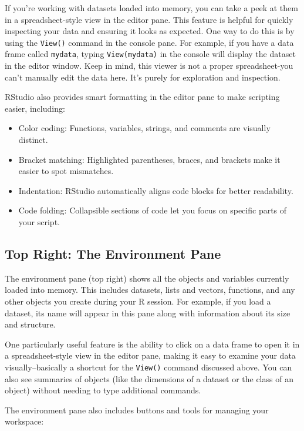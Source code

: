 \documentclass[
  letterpaper,
]{book}
\providecommand{\tightlist}{%
  \setlength{\itemsep}{0pt}\setlength{\parskip}{0pt}}\usepackage{longtable,booktabs,array}
\begin{document}
If you're working with datasets loaded into memory, you can take a peek
at them in a spreadsheet-style view in the editor pane. This feature is
helpful for quickly inspecting your data and ensuring it looks as
expected. One way to do this is by using the \texttt{View()} command in
the console pane. For example, if you have a data frame called
\texttt{mydata}, typing \texttt{View(mydata)} in the console will
display the dataset in the editor window. Keep in mind, this viewer is
not a proper spreadsheet-you can't manually edit the data here. It's
purely for exploration and inspection.

RStudio also provides smart formatting in the editor pane to make
scripting easier, including:

\begin{itemize}
\tightlist
\item
  Color coding: Functions, variables, strings, and comments are visually
  distinct.
\item
  Bracket matching: Highlighted parentheses, braces, and brackets make
  it easier to spot mismatches.
\item
  Indentation: RStudio automatically aligns code blocks for better
  readability.
\item
  Code folding: Collapsible sections of code let you focus on specific
  parts of your script.
\end{itemize}

\subsection{Top Right: The Environment
Pane}\label{top-right-the-environment-pane}

The environment pane (top right) shows all the objects and variables
currently loaded into memory. This includes datasets, lists and vectors,
functions, and any other objects you create during your R session. For
example, if you load a dataset, its name will appear in this pane along
with information about its size and structure.

One particularly useful feature is the ability to click on a data frame
to open it in a spreadsheet-style view in the editor pane, making it
easy to examine your data visually--basically a shortcut for the
\texttt{View()} command discussed above. You can also see summaries of
objects (like the dimensions of a dataset or the class of an object)
without needing to type additional commands.

The environment pane also includes buttons and tools for managing your
workspace:
\end{document}
